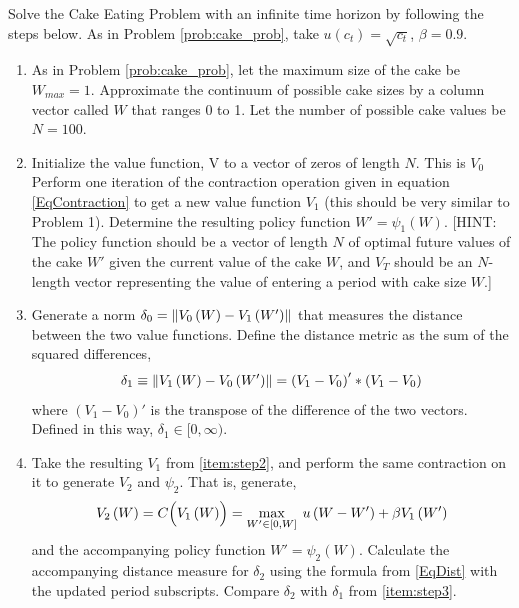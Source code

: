 \begin{problem}
Solve the Cake Eating Problem with an infinite time horizon by following the steps below.  As in Problem \ref{prob:cake_prob}, take $u(c_t) = \sqrt{c_t}$, $\beta = 0.9$.
\begin{enumerate}
\item As in Problem \ref{prob:cake_prob}, let the maximum size of the cake be $W_{max} = 1$. Approximate the continuum of possible cake sizes by a column vector called $W$ that ranges 0 to 1.  Let the number of possible cake values be $N=100$.

\item \label{item:step2} Initialize the value function, V to a vector of zeros of length $N$.  This is $V_0$  Perform one iteration of the contraction operation given in equation \eqref{EqContraction} to get a new value function $V_1$ (this should be very similar to Problem 1).  Determine the resulting policy function $W' = \psi_1\left(W\right)$.  [HINT: The policy function should be a vector of length $N$ of optimal future values of the cake $W'$ given the current value of the cake $W$, and $V_T$ should be an $N$-length vector representing the value of entering a period with cake size $W$.]

\item \label{item:step3} Generate a norm $\delta_0 = \left\lVert V_0\left(W\right) - V_1\left(W'\right)\right\rVert$ that measures the distance between the two value functions. Define the distance metric as the sum of the squared differences,
\begin{equation}
\label{EqDist}
\delta_1\equiv \left\lVert V_1\left(W\right) - V_0\left(W'\right)\right\rVert = \left(V_1 - V_0\right)'*\left(V_1 - V_0\right)
\end{equation}
where $\left(V_1-V_0\right)'$ is the transpose of the difference of the two vectors. Defined in this way, $\delta_1\in [0,\infty)$.

\item \label{item:step4} Take the resulting $V_1$ from \ref{item:step2}, and perform the same contraction on it to generate $V_2$ and $\psi_2$. That is, generate,
\begin{equation*}
  V_2\left(W\right) = C\Bigl(V_1\left(W\right)\Bigr) = \max_{W'\in[0,W]}\: u\left(W - W'\right) + \beta V_1\left(W'\right)
\end{equation*}
and the accompanying policy function $W'=\psi_2\left(W\right)$. Calculate the accompanying distance measure for $\delta_2$ using the formula from \eqref{EqDist} with the updated period subscripts. Compare $\delta_2$ with $\delta_1$ from \ref{item:step3}.


\end{enumerate}
\end{problem}
